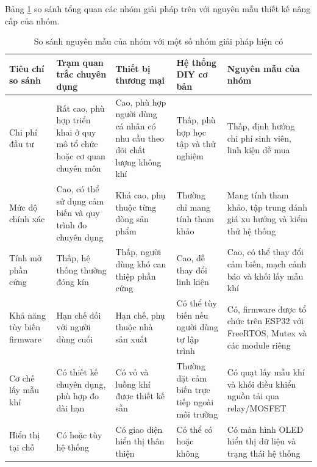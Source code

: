 Bảng \ref{tab:existingsolutions} so sánh tổng quan các nhóm giải pháp trên với nguyên mẫu thiết kế nâng cấp của nhóm.

\begin{table}[H]
\centering
\caption{So sánh nguyên mẫu của nhóm với một số nhóm giải pháp hiện có}
\label{tab:existingsolutions}
\footnotesize
\renewcommand{\arraystretch}{1.35}
\setlength{\tabcolsep}{4pt}

\begin{tabularx}{\textwidth}{|p{3.2cm}|X|X|X|X|}
\hline
\textbf{Tiêu chí so sánh} 
& \textbf{Trạm quan trắc chuyên dụng} 
& \textbf{Thiết bị thương mại} 
& \textbf{Hệ thống DIY cơ bản} 
& \textbf{Nguyên mẫu của nhóm} \\
\hline

Chi phí đầu tư 
& Rất cao, phù hợp triển khai ở quy mô tổ chức hoặc cơ quan chuyên môn 
& Cao, phù hợp người dùng cá nhân có nhu cầu theo dõi chất lượng không khí 
& Thấp, phù hợp học tập và thử nghiệm 
& Thấp, định hướng chi phí sinh viên, linh kiện dễ mua \\
\hline

Mức độ chính xác 
& Cao, có thể sử dụng cảm biến và quy trình đo chuyên dụng 
& Khá cao, phụ thuộc từng dòng sản phẩm 
& Thường chỉ mang tính tham khảo 
& Mang tính tham khảo, tập trung đánh giá xu hướng và kiểm thử hệ thống \\
\hline

Tính mở phần cứng 
& Thấp, hệ thống thường đóng kín 
& Thấp, người dùng khó can thiệp phần cứng 
& Cao, dễ thay đổi linh kiện 
& Cao, có thể thay đổi cảm biến, mạch cảnh báo và khối lấy mẫu khí \\
\hline

Khả năng tùy biến firmware 
& Hạn chế đối với người dùng cuối 
& Hạn chế, phụ thuộc nhà sản xuất 
& Có thể tùy biến nếu người dùng tự lập trình 
& Có, firmware được tổ chức trên ESP32 với FreeRTOS, Mutex và các module riêng \\
\hline

Cơ chế lấy mẫu khí 
& Có thiết kế chuyên dụng, phù hợp đo dài hạn 
& Có vỏ và luồng khí được thiết kế sẵn 
& Thường đặt cảm biến trực tiếp ngoài môi trường 
& Có quạt lấy mẫu khí và khối điều khiển nguồn tải qua relay/MOSFET \\
\hline

Hiển thị tại chỗ 
& Có hoặc tùy hệ thống 
& Có giao diện hiển thị thân thiện 
& Có thể có hoặc không 
& Có màn hình OLED hiển thị dữ liệu và trạng thái hệ thống \\
\hline


\end{tabularx}
\end{table}
